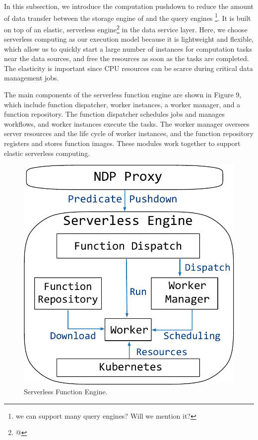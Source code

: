 In this subsection, we introduce the computation pushdown to reduce the amount of data transfer between the  storage engine of \sys and the query engines \footnote{we can support many query engines? Will we mention it?}. It is built on top of an elastic, serverless engine\footnote{@} in the data service layer. Here, we choose serverless computing as our execution model because it is lightweight  and flexible, which allow us to quickly start a large number of instances for computation tasks near the data sources, and free the resources as soon as the tasks are completed. The elasticity is important since CPU resources can be scarce during critical data management jobs.

The main components of the serverless function engine are shown in Figure 9, which include function dispatcher, worker instances, a worker manager, and a function repository. The function dispatcher schedules jobs and manages workflows, and worker instances execute the tasks. The worker manager oversees server resources and the life cycle of worker instances, and the function repository registers and stores function images. These modules work together to support elastic serverless computing.




\begin{figure}[htbp]
	\includegraphics[scale=0.35]{figures/serverless}
	\centering
	\vspace{-1em}
	\caption{Serverless Function Engine.}
	\label{fig:serverless}
	\vspace{-1em}
\end{figure}

